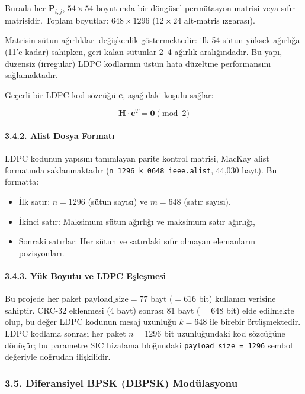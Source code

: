 \documentclass[
]{IEEEtran}
\providecommand{\tightlist}{%
  \setlength{\itemsep}{0pt}\setlength{\parskip}{0pt}}
\begin{document}
Burada her \(\mathbf{P}_{i,j}\), \(54 \times 54\) boyutunda bir döngüsel
permütasyon matrisi veya sıfır matrisidir. Toplam boyutlar:
\(648 \times 1296\) (\(12 \times 24\) alt-matris ızgarası).

Matrisin sütun ağırlıkları değişkenlik göstermektedir: ilk 54 sütun
yüksek ağırlığa (11'e kadar) sahipken, geri kalan sütunlar 2--4 ağırlık
aralığındadır. Bu yapı, düzensiz (irregular) LDPC kodlarının üstün hata
düzeltme performansını sağlamaktadır.

Geçerli bir LDPC kod sözcüğü \(\mathbf{c}\), aşağıdaki koşulu sağlar:

\[\mathbf{H} \cdot \mathbf{c}^T = \mathbf{0} \pmod{2}\]

\paragraph{3.4.2. Alist Dosya Formatı}\label{alist-dosya-formatux131}

LDPC kodunun yapısını tanımlayan parite kontrol matrisi, MacKay alist
formatında saklanmaktadır (\texttt{n\_1296\_k\_0648\_ieee.alist}, 44,030
bayt). Bu formatta:

\begin{itemize}
\tightlist
\item
  İlk satır: \(n = 1296\) (sütun sayısı) ve \(m = 648\) (satır sayısı),
\item
  İkinci satır: Maksimum sütun ağırlığı ve maksimum satır ağırlığı,
\item
  Sonraki satırlar: Her sütun ve satırdaki sıfır olmayan elemanların
  pozisyonları.
\end{itemize}

\paragraph{3.4.3. Yük Boyutu ve LDPC
Eşleşmesi}\label{yuxfck-boyutu-ve-ldpc-eux15fleux15fmesi}

Bu projede her paket \(\text{payload\_size} = 77\) bayt (\(= 616\) bit)
kullanıcı verisine sahiptir. CRC-32 eklenmesi (4 bayt) sonrası \(81\)
bayt (\(= 648\) bit) elde edilmekte olup, bu değer LDPC kodunun mesaj
uzunluğu \(k = 648\) ile birebir örtüşmektedir. LDPC kodlama sonrası her
paket \(n = 1296\) bit uzunluğundaki kod sözcüğüne dönüşür; bu parametre
SIC hizalama bloğundaki \texttt{payload\_size\ =\ 1296} sembol değeriyle
doğrudan ilişkilidir.

\subsubsection{3.5. Diferansiyel BPSK (DBPSK)
Modülasyonu}\label{diferansiyel-bpsk-dbpsk-moduxfclasyonu}
\end{document}
